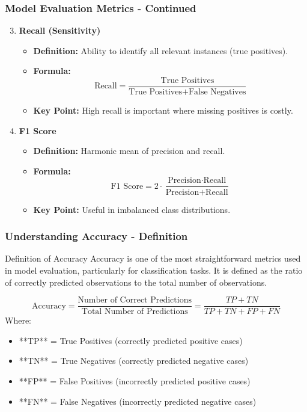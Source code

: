 \documentclass[aspectratio=169]{beamer}
\begin{document}
\begin{frame}[fragile]
    \frametitle{Model Evaluation Metrics - Continued}
    \begin{enumerate}
        \setcounter{enumi}{2}
        \item \textbf{Recall (Sensitivity)}
            \begin{itemize}
                \item \textbf{Definition:} Ability to identify all relevant instances (true positives).
                \item \textbf{Formula:}
                \[
                \text{Recall} = \frac{\text{True Positives}}{\text{True Positives} + \text{False Negatives}}
                \]
                \item \textbf{Key Point:} High recall is important where missing positives is costly.
            \end{itemize}

        \item \textbf{F1 Score}
            \begin{itemize}
                \item \textbf{Definition:} Harmonic mean of precision and recall.
                \item \textbf{Formula:}
                \[
                \text{F1 Score} = 2 \cdot \frac{\text{Precision} \cdot \text{Recall}}{\text{Precision} + \text{Recall}}
                \]
                \item \textbf{Key Point:} Useful in imbalanced class distributions.
            \end{itemize}
    \end{enumerate}
\end{frame}

\begin{frame}[fragile]
    \frametitle{Understanding Accuracy - Definition}
    \begin{block}{Definition of Accuracy}
        Accuracy is one of the most straightforward metrics used in model evaluation, particularly for classification tasks. It is defined as the ratio of correctly predicted observations to the total number of observations.
    \end{block}
    \begin{equation}
        \text{Accuracy} = \frac{\text{Number of Correct Predictions}}{\text{Total Number of Predictions}} = \frac{TP + TN}{TP + TN + FP + FN}
    \end{equation}
    Where:
    \begin{itemize}
        \item **TP** = True Positives (correctly predicted positive cases)
        \item **TN** = True Negatives (correctly predicted negative cases)
        \item **FP** = False Positives (incorrectly predicted positive cases)
        \item **FN** = False Negatives (incorrectly predicted negative cases)
    \end{itemize}
\end{frame}
\end{document}
